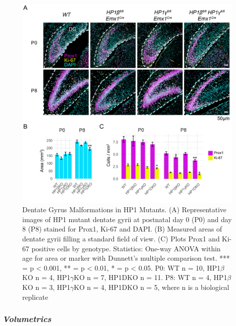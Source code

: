 \documentclass[onehalf,12pt]{beavtex}
\begin{document}
  \begin{figure}
  
  {\centering \includegraphics[width=1\linewidth, ]{./figure/results/DGprox1ki67} 
  
  }
  
  \caption[Dentate Gyrus Malformations in HP1 Mutants]{Dentate Gyrus Malformations in HP1 Mutants. (A) Representative images of HP1 mutant dentate gyrii at postnatal day 0 (P0) and day 8 (P8) stained for Prox1, Ki-67 and DAPI. (B) Measured areas of dentate gyrii filling a standard field of view. (C) Plots Prox1 and Ki-67 positive cells by genotype.  Statistics: One-way ANOVA within age for area or marker with Dunnett's multiple comparison test. *** = p < 0.001, ** = p < 0.01, * = p < 0.05. P0: WT n = 10, HP1$\beta$KO n = 4, HP1$\gamma$KO n = 7, HP1DKO n = 11. P8: WT n = 4, HP1$\beta$KO n = 3, HP1$\gamma$KO n = 4, HP1DKO n = 5, where n is a biological replicate}\label{fig:prox1ki67}
  \end{figure}
  
  \FloatBarrier
  \clearpage
  
  \subsubsection*{\texorpdfstring{\emph{Volumetrics}}{Volumetrics}}\label{volumetrics}
  
\end{document}
